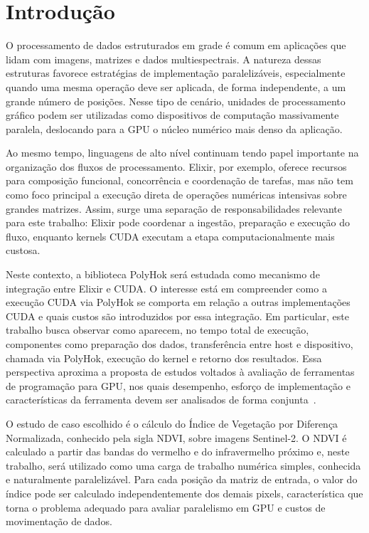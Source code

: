 \documentclass[tcc,capa]{texufpel}
\begin{document}
\tableofcontents

\chapter{Introdução}

O processamento de dados estruturados em grade é comum em aplicações que lidam
com imagens, matrizes e dados multiespectrais. A natureza dessas estruturas favorece
estratégias de implementação paralelizáveis, especialmente quando uma mesma
operação deve ser aplicada, de forma independente, a um grande número de posições.
Nesse tipo de cenário, unidades de processamento gráfico podem ser utilizadas como
dispositivos de computação massivamente paralela, deslocando para a GPU o núcleo
numérico mais denso da aplicação.

Ao mesmo tempo, linguagens de alto nível continuam tendo papel importante na
organização dos fluxos de processamento. Elixir, por exemplo, oferece recursos para
composição funcional, concorrência e coordenação de tarefas, mas não tem como foco
principal a execução direta de operações numéricas intensivas sobre grandes matrizes.
Assim, surge uma separação de responsabilidades relevante para este trabalho:
Elixir pode coordenar a ingestão, preparação e execução do fluxo, enquanto kernels
CUDA executam a etapa computacionalmente mais custosa.

Neste contexto, a biblioteca PolyHok será estudada como mecanismo de integração
entre Elixir e CUDA. O interesse está em compreender como a execução CUDA via
PolyHok se comporta em relação a outras implementações CUDA e quais custos são
introduzidos por essa integração. Em particular, este trabalho busca observar
como aparecem, no tempo total de execução, componentes como preparação dos dados,
transferência entre host e dispositivo, chamada via PolyHok, execução do kernel e
retorno dos resultados. Essa perspectiva aproxima a proposta de estudos voltados à
avaliação de ferramentas de programação para GPU, nos quais desempenho, esforço
de implementação e características da ferramenta devem ser analisados de forma
conjunta~\cite{diDomenico2022,duBoisCavalheiro2025}.

O estudo de caso escolhido é o cálculo do Índice de Vegetação por Diferença
Normalizada, conhecido pela sigla NDVI, sobre imagens Sentinel-2. O NDVI é
calculado a partir das bandas do vermelho e do infravermelho próximo e, neste
trabalho, será utilizado como uma carga de trabalho numérica simples, conhecida e
naturalmente paralelizável. Para cada posição da matriz de entrada, o valor do
índice pode ser calculado independentemente dos demais pixels, característica que
torna o problema adequado para avaliar paralelismo em GPU e custos de movimentação
de dados.
\end{document}
